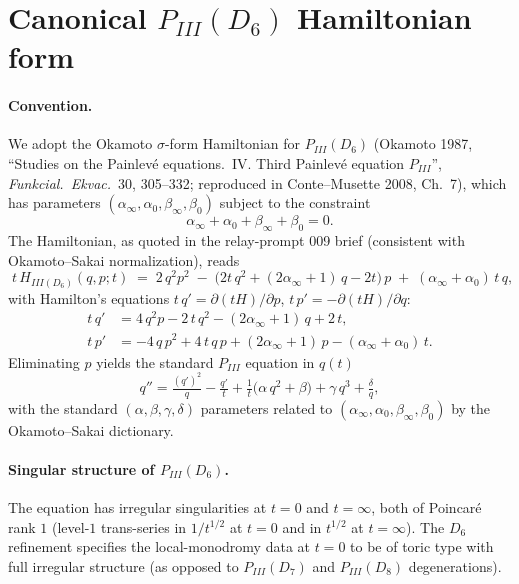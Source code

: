 
\section*{Canonical $P_{III}(D_6)$ Hamiltonian form}
\label{sec:pIII-canonical}

\paragraph{Convention.}
We adopt the Okamoto $\sigma$-form Hamiltonian for
$P_{III}(D_6)$ (Okamoto 1987, ``Studies on the Painlev\'e
equations.~IV. Third Painlev\'e equation $P_{III}$'',
\textsl{Funkcial.~Ekvac.}~30, 305--332; reproduced in
Conte--Musette 2008, Ch.~7), which has parameters
$(\alpha_\infty,\alpha_0,\beta_\infty,\beta_0)$ subject to the
constraint
\[
  \alpha_\infty + \alpha_0 + \beta_\infty + \beta_0 = 0.
\]
The Hamiltonian, as quoted in the relay-prompt 009 brief
(consistent with Okamoto--Sakai normalization), reads
\[
  \boxed{\;
    t\,H_{III(D_6)}(q,p;t) \;=\;
      2\,q^2 p^2
      \;-\;\bigl(2 t\,q^2 + (2\alpha_\infty+1)\,q - 2 t\bigr)\,p
      \;+\;(\alpha_\infty + \alpha_0)\,t\,q,
  \;}
\]
with Hamilton's equations $t\,q' = \partial(t H)/\partial p$,
$t\,p' = -\partial(t H)/\partial q$:
\[
  \begin{aligned}
    t\,q' &= 4\,q^2 p - 2\,t\,q^2 - (2\alpha_\infty+1)\,q + 2\,t, \\
    t\,p' &= -4\,q\,p^2 + 4\,t\,q\,p + (2\alpha_\infty+1)\,p
              - (\alpha_\infty+\alpha_0)\,t.
  \end{aligned}
\]
Eliminating $p$ yields the standard $P_{III}$ equation in $q(t)$
\[
  q'' = \tfrac{(q')^2}{q} - \tfrac{q'}{t}
       + \tfrac{1}{t}\bigl(\alpha\,q^2 + \beta\bigr)
       + \gamma\,q^3 + \tfrac{\delta}{q},
\]
with the standard $(\alpha,\beta,\gamma,\delta)$ parameters
related to $(\alpha_\infty,\alpha_0,\beta_\infty,\beta_0)$ by
the Okamoto--Sakai dictionary.

\paragraph{Singular structure of $P_{III}(D_6)$.}
The equation has irregular singularities at $t=0$ and
$t=\infty$, both of Poincar\'e rank $1$ (level-$1$ trans-series
in $1/t^{1/2}$ at $t=0$ and in $t^{1/2}$ at $t=\infty$). The
$D_6$ refinement specifies the local-monodromy data at $t=0$
to be of toric type with full irregular structure (as opposed
to $P_{III}(D_7)$ and $P_{III}(D_8)$ degenerations).

